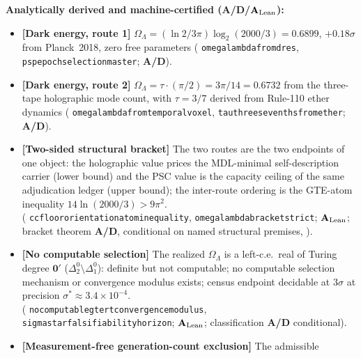 \documentclass[11pt]{article}
\theoremstyle{remark}
\newcommand{\lean}[1]{%
  \penalty-100
  \begingroup\def\_{\textunderscore\allowbreak}\texttt{#1}\endgroup}
\newcommand{\OmL}{\Omega_\Lambda}
\newcommand{\CatAL}{\ensuremath{\textbf{A}_{\rm Lean}}}
\newcommand{\CatAD}{\textbf{A/D}}
\begin{document}
\begin{tcolorbox}[colback=orange!8,colframe=orange!60!black,
  title={\textbf{What this paper claims}},
  fonttitle=\bfseries,left=6pt,right=6pt,top=5pt,bottom=5pt,breakable]
\small
\textbf{Analytically derived and machine-certified (\CatAD/\CatAL):}
\begin{itemize}[noitemsep,topsep=2pt]
  \item \textbf{[Dark energy, route 1]} $\OmL = (\ln2/3\pi)\log_2(2000/3) =
        0.6899$, $+0.18\sigma$ from Planck~2018, zero free parameters
        (\lean{omega\_lambda\_from\_d\_res}, \lean{psp\_epoch\_selection\_master};
        \CatAD).
  \item \textbf{[Dark energy, route 2]} $\OmL = \tau\cdot(\pi/2) = 3\pi/14 =
        0.6732$ from the three-tape holographic mode count, with $\tau = 3/7$
        derived from Rule-110 ether dynamics
        (\lean{omega\_lambda\_from\_temporal\_voxel},
        \lean{tau\_three\_sevenths\_from\_ether}; \CatAD).
  \item \textbf{[Two-sided structural bracket]} The two routes are the two
        endpoints of one object: the holographic value prices the MDL-minimal
        self-description carrier (lower bound) and the PSC value is the
        capacity ceiling of the same adjudication ledger (upper bound); the
        inter-route ordering is the GTE-atom inequality
        $14\ln(2000/3) > 9\pi^2$.\\
        (\lean{cc\_floor\_orientation\_atom\_inequality},
        \lean{omega\_lambda\_bracket\_strict}; \CatAL; bracket theorem \CatAD,
        conditional on named structural premises, ).
  \item \textbf{[No computable selection]} The realized $\OmL$ is a
        left-c.e.\ real of Turing degree $\mathbf{0}'$
        ($\Delta_2^0\setminus\Delta_1^0$): definite but not computable; no
        computable selection mechanism or convergence modulus exists; census
        endpoint decidable at $3\sigma$ at precision
        $\sigma^* \approx 3.4\times10^{-4}$.\\
        (\lean{no\_computable\_gte\_rt\_convergence\_modulus},
        \lean{sigma\_star\_falsifiability\_horizon}; \CatAL; classification
        \CatAD{} conditional).
  \item \textbf{[Measurement-free generation-count exclusion]} The admissible

\end{itemize}
\end{tcolorbox}
\end{document}
